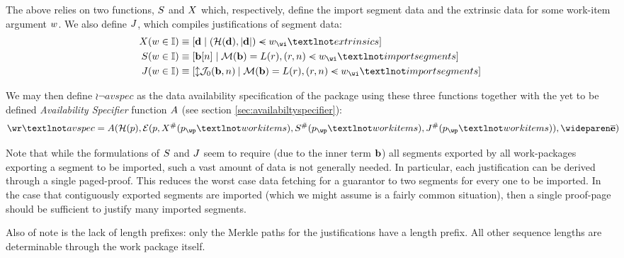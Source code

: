 The above relies on two functions, $S$ and $X$ which, respectively, define the import segment data and the extrinsic data for some work-item argument $w$. We also define $J$, which compiles justifications of segment data:
\begin{equation}
  \begin{aligned}
    \extrinsicdata(\wiX \in \workitem) &\equiv \sq{\build{\mathbf{d}}{(\blake(\mathbf{d}), \len{\mathbf{d}}) \orderedin \wiX_\wi¬extrinsics}} \\
    \importsegmentdata(\wiX \in \workitem) &\equiv \sq{\build{\segsX[n]}{\merklizecd(\segsX) = \segrootlookup(r), (r, n) \orderedin \wiX_\wi¬importsegments}} \\
    \justifysegmentdata(\wiX \in \workitem) &\equiv \sq{\build{\var{\merklejustsubpath_0(\segsX, n)}}{\merklizecd(\segsX) = \segrootlookup(r), (r, n) \orderedin \wiX_\wi¬importsegments}}
  \end{aligned}
\end{equation}

We may then define $\wr¬avspec$ as the data availability specification of the package using these three functions together with the yet to be defined \emph{Availability Specifier} function $A$ (see section \ref{sec:availabiltyspecifier}):
\begin{equation}
  \wr¬avspec = \newavailabilityspecifier(
    \blake(\wpX),
    \se(
      \wpX,
      \extrinsicdata^\#(\wpX_\wp¬workitems),
      \importsegmentdata^\#(\wpX_\wp¬workitems),
      \justifysegmentdata^\#(\wpX_\wp¬workitems)
    ),
    \concatall{\allexports}
  )\!\!\!\!
\end{equation}

Note that while the formulations of $S$ and $J$ seem to require (due to the inner term $\mathbf{b}$) all segments exported by all work-packages exporting a segment to be imported, such a vast amount of data is not generally needed. In particular, each justification can be derived through a single paged-proof. This reduces the worst case data fetching for a guarantor to two segments for every one to be imported. In the case that contiguously exported segments are imported (which we might assume is a fairly common situation), then a single proof-page should be sufficient to justify many imported segments.

Also of note is the lack of length prefixes: only the Merkle paths for the justifications have a length prefix. All other sequence lengths are determinable through the work package itself.

